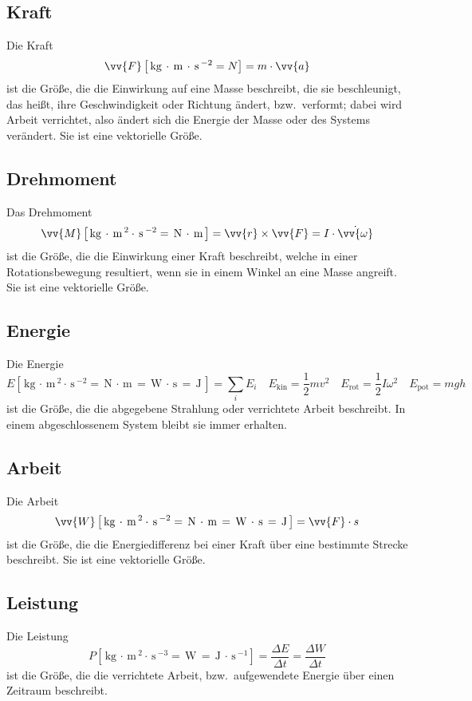 \documentclass[a4paper,12pt]{article}
\begin{document}
\subsection{Kraft}
Die Kraft
\[ 
        \vv{F}\left[\,\text{kg}\,\cdot \,\text{m}\,\cdot \,\text{s}\, ^{-2}=N\right]=m\cdot \vv{a}
\] 
ist die Größe, die die Einwirkung auf eine Masse beschreibt, die sie beschleunigt, das heißt, ihre Geschwindigkeit oder Richtung ändert, bzw.\ verformt; dabei wird Arbeit verrichtet, also ändert sich die Energie der Masse oder des Systems verändert. Sie ist eine vektorielle Größe. 

\subsection{Drehmoment}
Das Drehmoment
\[ 
        \vv{M}\left[\,\text{kg}\,\cdot \,\text{m}\,^2\cdot \,\text{s}\, ^{-2}=\,\text{N}\,\cdot \,\text{m}\,\right]=\vv{r}\times \vv{F}=I\cdot \dot{\vv{\omega }}
\] 
ist die Größe, die die Einwirkung einer Kraft beschreibt, welche in einer Rotationsbewegung resultiert, wenn sie in einem Winkel an eine Masse angreift. Sie ist eine vektorielle Größe.

\subsection{Energie}
Die Energie
\[ 
        E\left[\,\text{kg}\,\cdot \,\text{m}\,^2\cdot \,\text{s}\, ^{-2}=\,\text{N}\,\cdot \,\text{m}\,=\,\text{W}\,\cdot \,\text{s}\,=\,\text{J}\,\right]=\sum_{i}^{}E_i\quad E_{\text{kin}}=\dfrac{1}{2}mv^2\quad E_{\text{rot}}=\dfrac{1}{2}I\omega ^2\quad E_{\text{pot}}=mgh
\] 
ist die Größe, die die abgegebene Strahlung oder verrichtete Arbeit beschreibt. In einem abgeschlossenem System bleibt sie immer erhalten.

\subsection{Arbeit}
Die Arbeit
\[ 
        \vv{W}\left[\,\text{kg}\,\cdot \,\text{m}\,^2\cdot \,\text{s}\, ^{-2}=\,\text{N}\,\cdot \,\text{m}\,=\,\text{W}\,\cdot \,\text{s}\,=\,\text{J}\,\right]=\vv{F}\cdot s
\] 
ist die Größe, die die Energiedifferenz bei einer Kraft über eine bestimmte Strecke beschreibt. Sie ist eine vektorielle Größe.

\subsection{Leistung}
Die Leistung
\[ 
        P\left[\,\text{kg}\,\cdot \,\text{m}\,^2\cdot \,\text{s}\, ^{-3}=\,\text{W}\,=\,\text{J}\,\cdot \,\text{s}\, ^{-1}\right]=\dfrac{\Delta E}{\Delta t}=\dfrac{\Delta W}{\Delta t}
\] 
ist die Größe, die die verrichtete Arbeit, bzw.\ aufgewendete Energie über einen Zeitraum beschreibt.
\end{document}
